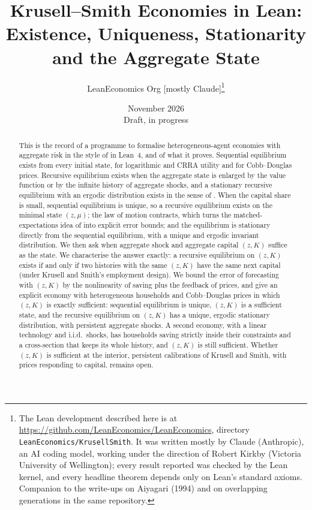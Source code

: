 \documentclass[11pt]{article}
\title{Krusell--Smith Economies in Lean:\\ Existence, Uniqueness, Stationarity and the Aggregate State}
\author{LeanEconomics Org [mostly Claude]\thanks{The Lean development described here is at
\url{https://github.com/LeanEconomics/LeanEconomics}, directory \texttt{LeanEconomics/KrusellSmith}.
It was written mostly by Claude (Anthropic), an AI coding model, working under the direction of
Robert Kirkby (Victoria University of Wellington); every result reported was checked by the Lean
kernel, and every headline theorem depends only on Lean's standard axioms. Companion to the
write-ups on Aiyagari (1994) and on overlapping generations in the same repository.}}
\date{November 2026\\[0.5em]\small Draft, in progress}
\theoremstyle{definition}
\theoremstyle{remark}
\begin{document}
\maketitle

\begin{abstract}
\noindent
This is the record of a programme to formalise heterogeneous-agent economies with aggregate risk in
the style of \citet{krusellsmith1998} in Lean~4, and of what it proves. Sequential equilibrium
exists from every initial state, for logarithmic and CRRA utility and for Cobb--Douglas prices.
Recursive equilibrium exists when the aggregate state is enlarged by the value function or by the
infinite history of aggregate shocks, and a stationary recursive equilibrium with an ergodic
distribution exists in the sense of \citet{dgmm1994}. When the capital share is small, sequential
equilibrium is unique, so a recursive equilibrium exists on the minimal state $(z,\mu)$; the law of
motion contracts, which turns the matched-expectations idea of \citet{lee2026} into explicit error
bounds; and the equilibrium is stationary directly from the sequential equilibrium, with a unique
and ergodic invariant distribution. We then ask when aggregate shock and aggregate capital $(z,K)$
suffice as the state. We characterise the answer exactly: a recursive equilibrium on $(z,K)$
exists if and only if two histories with the same $(z,K)$ have the same next capital (under Krusell
and Smith's employment design). We bound the
error of forecasting with $(z,K)$ by the nonlinearity of saving plus the feedback of prices, and give
an explicit economy with heterogeneous households and Cobb--Douglas prices in which $(z,K)$ is
exactly sufficient: sequential equilibrium is unique, $(z,K)$ is a sufficient state, and the recursive
equilibrium on $(z,K)$ has a unique, ergodic stationary distribution, with persistent aggregate
shocks. A second economy, with a linear technology and i.i.d.\ shocks, has households saving
strictly inside their constraints and a cross-section that keeps its whole history, and $(z,K)$ is
still sufficient. Whether $(z,K)$ is sufficient at the interior, persistent calibrations of Krusell
and Smith, with prices responding to capital, remains open.
\end{abstract}

\tableofcontents















\appendix

\end{document}

